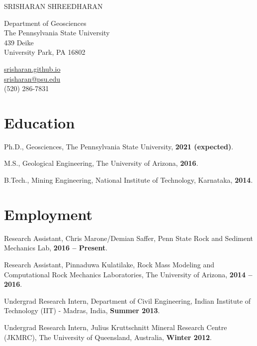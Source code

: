 \documentclass[11pt,letterpaper]{article}
\def\name{Srisharan Shreedharan}
\renewenvironment{itemize}{
  \begin{list}{}{
      \setlength{\leftmargin}{1.5em}
      \setlength{\itemsep}{0.25em}
      \setlength{\parskip}{0pt}
      \setlength{\parsep}{0.25em}
    }
}{
  \end{list}
}
\begin{document}
\MakeUppercase{\huge\name}


\bigskip
\begin{minipage}[t]{0.495\textwidth}
  Department of Geosciences \\
  The Pennsylvania State University \\
  439 Deike \\
  University Park, PA 16802 
\end{minipage}
\begin{minipage}[t]{0.495\textwidth}
  \href{https://srisharan.github.io/}{srisharan.github.io} \\
  \href{mailto:srisharan@psu.edu}{srisharan@psu.edu} \\
  (520) 286-7831
\end{minipage}


\section*{Education}
\begin{itemize}
  \item Ph.D., Geosciences, The Pennsylvania State University, {\bf 2021 (expected)}.

  \item M.S., Geological Engineering, The University of Arizona, {\bf 2016}.

  \item B.Tech., Mining Engineering, National Institute of Technology, Karnataka, {\bf 2014}.
\end{itemize}




\section*{Employment}
\begin{itemize}

    \item Research  Assistant, Chris Marone/Demian Saffer, Penn State Rock and Sediment Mechanics Lab, {\bf 2016 -- Present}.
      
    \item Research Assistant, Pinnaduwa Kulatilake, Rock Mass Modeling and Computational Rock Mechanics Laboratories, The University of Arizona, {\bf 2014 -- 2016}.
    
    \item Undergrad Research Intern, Department of Civil Engineering, Indian Institute of Technology (IIT) - Madras, India, {\bf Summer 2013}.
    
    \item Undergrad Research Intern, Julius Kruttschnitt Mineral Research Centre (JKMRC), The University of Queensland, Australia, {\bf Winter 2012}.
\end{itemize}
\end{document}
